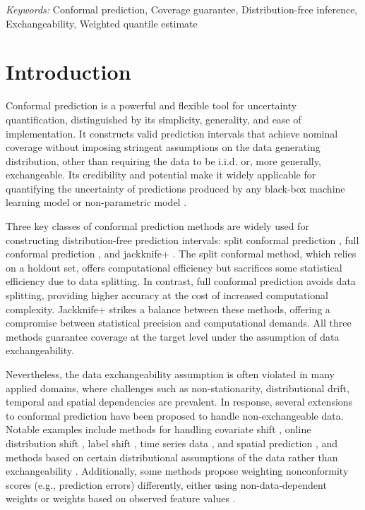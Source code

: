 \documentclass[
  11pt,
  12pt]{article}
\theoremstyle{plain}
\theoremstyle{remark}
\begin{document}
\noindent%
{\it Keywords:} Conformal prediction, Coverage
guarantee, Distribution-free inference, Exchangeability, Weighted
quantile estimate
\vfill

\newpage

\renewcommand{\theproposition}{\arabic{proposition}} %
\setcounter{proposition}{0}

\section{Introduction}\label{sec-intro}

Conformal prediction \citep{vovk2005} is a powerful and flexible tool
for uncertainty quantification, distinguished by its simplicity,
generality, and ease of implementation. It constructs valid prediction
intervals that achieve nominal coverage without imposing stringent
assumptions on the data generating distribution, other than requiring
the data to be i.i.d. or, more generally, exchangeable. Its credibility
and potential make it widely applicable for quantifying the uncertainty
of predictions produced by any black-box machine learning model
\citep{shafer2008, papadopoulos2008, barber2021} or non-parametric model
\citep{lei2014}.

Three key classes of conformal prediction methods are widely used for
constructing distribution-free prediction intervals: split conformal
prediction \citep{vovk2005}, full conformal prediction \citep{vovk2005},
and jackknife+ \citep{barber2021}. The split conformal method, which
relies on a holdout set, offers computational efficiency but sacrifices
some statistical efficiency due to data splitting. In contrast, full
conformal prediction avoids data splitting, providing higher accuracy at
the cost of increased computational complexity. Jackknife+ strikes a
balance between these methods, offering a compromise between statistical
precision and computational demands. All three methods guarantee
coverage at the target level under the assumption of data
exchangeability.

Nevertheless, the data exchangeability assumption is often violated in
many applied domains, where challenges such as non-stationarity,
distributional drift, temporal and spatial dependencies are prevalent.
In response, several extensions to conformal prediction have been
proposed to handle non-exchangeable data. Notable examples include
methods for handling covariate shift
\citep{tibshirani2019, lei2021, yang2024}, online distribution shift
\citep{gibbs2021, zaffran2022, bastani2022}, label shift
\citep{podkopaev2021}, time series data
\citep{chernozhukov2018, gibbs2021, xu2021, xu2023, zaffran2022}, and
spatial prediction \citep{mao2024}, and methods based on certain
distributional assumptions of the data rather than exchangeability
\citep{oliveira2024, xu2021, xu2023}. Additionally, some methods propose
weighting nonconformity scores (e.g., prediction errors) differently,
either using non-data-dependent weights \citep{barber2023} or weights
based on observed feature values
\citep{tibshirani2019, guan2023, hore2023}.
\end{document}
